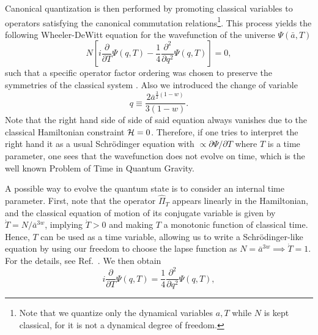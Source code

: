 \documentclass[a4paper,11pt]{article}
\newcommand{\dpar}[1]{\left(#1 \right)}
\newcommand{\dcol}[1]{\left[#1 \right]}
\begin{document}
        {\color{red}
        Canonical quantization is then performed by promoting classical variables to operators satisfying the canonical commutation relations\footnote{\color{red} Note that we quantize only the dynamical variables $a,T$ while $N$ is kept classical, for it is not a dynamical degree of freedom.}. This process yields the following Wheeler-DeWitt equation for the wavefunction of the universe  $\Psi(\bar{a}, T)$ \cite{nelson_peter_bouncing_original}
        \begin{equation}
                \label{wdweq}
            N\dcol{ i\frac{\partial}{\partial T}\Psi(q,T) - \frac{1}{4}\frac{\partial^{2}}{\partial q^{2}}\Psi(q,T) } = 0 ,
        \end{equation}
        such that a specific operator factor ordering was chosen to preserve the symmetries of the classical system \cite{halliwell1990introductory} . Also we introduced the change of variable
        \begin{equation}
            q \equiv \frac{2\bar{a}^{\frac{3}{2}\dpar{1-w} } }{ 3\dpar{1-w } }
        .\end{equation}
        Note that the right hand side of side of said equation always  vanishes due to the classical Hamiltonian constraint ${\cal H}=0$. Therefore, if one tries to interpret the right hand it as a usual Schrödinger equation with $\propto \partial \Psi / \partial T$ where $T$ is a time parameter, one sees that the wavefunction does not evolve on time, which is the well known Problem of Time in Quantum Gravity.

        A possible way to evolve the quantum state is to consider an internal time parameter. First, note that the operator $\hat{\Pi}_T$ appears linearly in the Hamiltonian, and the classical equation of motion of its conjugate variable is given by
        $\dot{T} = { N }/{ \bar{a}^{3w} }$, implying $\dot{T} > 0$ and making $T$ a monotonic function of classical time. Hence, $T$ can be used as a time variable, allowing us to write a Schrödinger-like equation by using our freedom to choose the lapse function as $N = \bar{a}^{3w} \implies \dot{T} = 1$. For the details, see Ref.~\cite{fluidgeral}. We then obtain
                \begin{equation}
                \label{wdweq}
            i\frac{\partial}{\partial T}\Psi(q,T) = \frac{1}{4}\frac{\partial^{2}}{\partial q^{2}}\Psi(q,T),
        \end{equation} }
       
\end{document}
